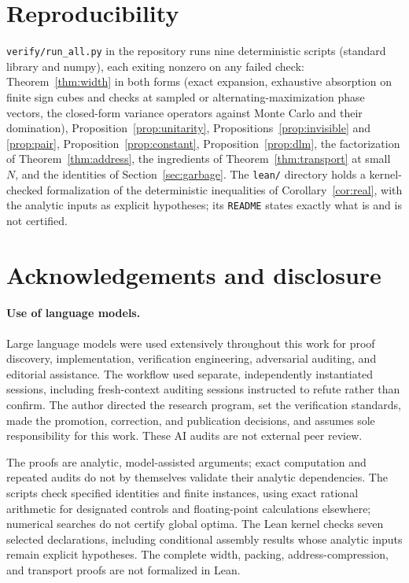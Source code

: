 \documentclass[11pt,a4paper]{article}
\theoremstyle{plain}
\theoremstyle{definition}
\theoremstyle{remark}
\begin{document}
\section{Reproducibility}\label{sec:repro}

\texttt{verify/run\_all.py} in the repository runs nine deterministic scripts
(standard library and numpy),
each exiting nonzero on any failed check: Theorem~\ref{thm:width} in both forms (exact
expansion, exhaustive absorption on finite sign cubes and checks at sampled or
alternating-maximization phase vectors, the closed-form variance
operators against Monte Carlo and their domination), Proposition~\ref{prop:unitarity},
Propositions~\ref{prop:invisible} and \ref{prop:pair}, Proposition~\ref{prop:constant},
Proposition~\ref{prop:dlm}, the factorization of Theorem~\ref{thm:address}, the ingredients of
Theorem~\ref{thm:transport} at small $N$, and the identities of Section~\ref{sec:garbage}.
The \texttt{lean/} directory holds a kernel-checked formalization of the deterministic inequalities
of Corollary~\ref{cor:real}, with the analytic inputs as explicit hypotheses; its
\texttt{README} states exactly what is and is not certified.

\section*{Acknowledgements and disclosure}

\paragraph{Use of language models.}
Large language models were used extensively throughout this work for proof discovery,
implementation, verification engineering, adversarial auditing, and editorial assistance.
The workflow used separate, independently instantiated sessions, including fresh-context
auditing sessions instructed to refute rather than confirm. The author directed the
research program, set the verification standards, made the promotion, correction, and
publication decisions, and assumes sole responsibility for this work. These AI audits
are not external peer review.

The proofs are analytic, model-assisted arguments; exact computation and repeated audits
do not by themselves validate their analytic dependencies. The scripts check specified
identities and finite instances, using exact rational arithmetic for designated controls
and floating-point calculations elsewhere; numerical searches do not certify global
optima. The Lean kernel checks seven selected declarations, including conditional
assembly results whose analytic inputs remain explicit hypotheses. The complete width,
packing, address-compression, and transport proofs are not formalized in Lean.
\end{document}
